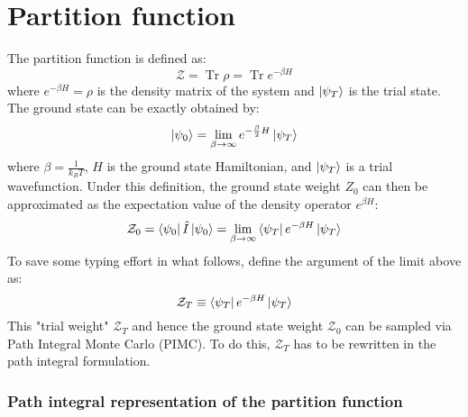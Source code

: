 \documentclass[12pt, two sided]{article}
\DeclareMathOperator{\Tr}{Tr}
\begin{document}
\section{Partition function}

The partition function is defined as:
%
\begin{equation}
\mathcal{Z}  = \Tr \rho \nonumber = \Tr e^{-\beta H} 
\end{equation}
%
where $e^{-\beta H} = \rho$ is the density matrix of the system and $\ket{\psi_T}$ is the trial state. The ground state can be exactly obtained by:
%
\begin{equation}
\ket{\psi_0} = \lim_{\beta\to\infty} e^{-\frac{\beta}{2} H}\ket{\psi_T} 
\end{equation}
%
where $\beta = \frac{1}{k_B  T}$, $H$ is the ground state Hamiltonian, and $\ket{\psi_T}$ is a trial wavefunction. Under this definition, the ground state weight $Z_0$ can then be approximated as the expectation value of the density operator $e^{\beta H}$:
%
\begin{equation}
\label{eq:z_0_01}
\mathcal{Z}_0 = \bra{\psi_0} \hat{I} \ket{\psi_0} = \lim_{\beta\to\infty} \bra{\psi_T} e^{-\beta H} \ket{\psi_T}
\end{equation}
%
To save some typing effort in what follows, define the argument of the limit above as:
%
\begin{equation}
\mathcal{Z}_T \equiv  \bra{\psi_T} e^{-\beta H} \ket{\psi_T}
\end{equation}
%
This "trial weight" $\mathcal{Z}_T$ and hence the ground state weight $\mathcal{Z_0}$ can be sampled via Path Integral Monte Carlo (PIMC). To do this, $\mathcal{Z}_T$ has to be rewritten in the path integral formulation.

\subsubsection{Path integral representation of the partition function}
\end{document}
